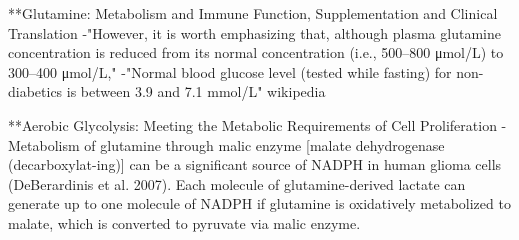\documentclass[11pt,a4paper]{article}
\begin{document}
**Glutamine: Metabolism and Immune Function, Supplementation and Clinical Translation
-"However, it is worth emphasizing that, although plasma glutamine concentration is reduced from its normal concentration (i.e., 500–800 μmol/L) to 300–400 μmol/L,"
-"Normal blood glucose level (tested while fasting) for non-diabetics is between 3.9 and 7.1 mmol/L" wikipedia

**Aerobic Glycolysis: Meeting the Metabolic Requirements of Cell Proliferation
-Metabolism of glutamine through malic enzyme [malate dehydrogenase (decarboxylat-ing)] can be a significant source of NADPH in human glioma cells (DeBerardinis et al. 2007). Each molecule of glutamine-derived lactate can generate up to one molecule of NADPH if glutamine is oxidatively metabolized to malate, which is converted to pyruvate via malic enzyme.
\end{document}
